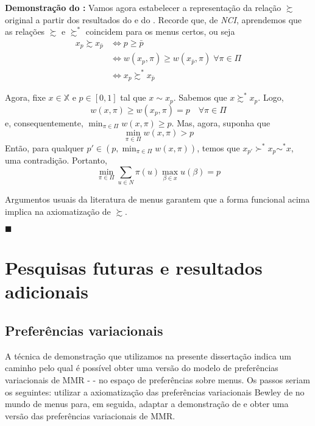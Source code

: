 \documentclass[11pt, a4paper]{article}
\theoremstyle{nonumberplain}
\theoremstyle{plain}
\theoremstyle{plain}
\theoremstyle{plain}
\begin{document}
\noindent
\textbf{Demonstração do :} Vamos agora estabelecer a representação da relação $\succsim$ original a partir dos resultados do  e do . Recorde que, de \emph{NCI}, aprendemos que as relações $\succsim$ e $\succsim^*$ coincidem para os menus certos, ou seja
\begin{align*}
x_p\succsim x_{\bar{p}}&\Leftrightarrow p\geq \bar{p}\\
&\Leftrightarrow w(x_p,\pi)\geq w(x_{\bar{p}},\pi)\; \forall\pi\in\Pi \\
&\Leftrightarrow x_p\succsim^* x_{\bar{p}} 
\end{align*}

Agora, fixe $x\in \mathbb{X}$ e $p\in[0,1]$ tal que $x\sim x_p$. Sabemos que $x\succsim^* x_p$. Logo, $$w(x,\pi)\geq w(x_p,\pi)=p\quad\forall\pi \in \Pi$$ e, consequentemente, $\min_{\pi\in\Pi}w(x,\pi)\geq p$. Mas, agora, suponha que $$\min_{\pi\in\Pi}w(x,\pi)> p$$ Então, para qualquer $p'\in (p,\min_{\pi\in\Pi}w(x,\pi))$, temos que $x_{p'}\succ^* x_p\sim^* x$, uma contradição. Portanto, $$\min_{\pi\in\Pi}\sum_{u\in N} \pi(u)\max_{\beta\in x}u(\beta)=p$$   

Argumentos usuais da literatura de menus garantem que a forma funcional acima implica na axiomatização de $\succsim$. 
\begin{flushright}
$\blacksquare$
\end{flushright}

\section{Pesquisas futuras e resultados adicionais}
\subsection{Preferências variacionais}
A técnica de demonstração que utilizamos na presente dissertação indica um caminho pelo qual é possível obter uma versão do modelo de preferências variacionais de MMR - \cite{Maccheroni2006} - no espaço de preferências sobre menus. Os passos seriam os seguintes: utilizar a axiomatização das preferências variacionais Bewley de \cite{Faro2015} no mundo de menus para, em seguida, adaptar a demonstração de \cite{Brotherhood2014} e obter uma versão das preferências variacionais de MMR.
\end{document}
